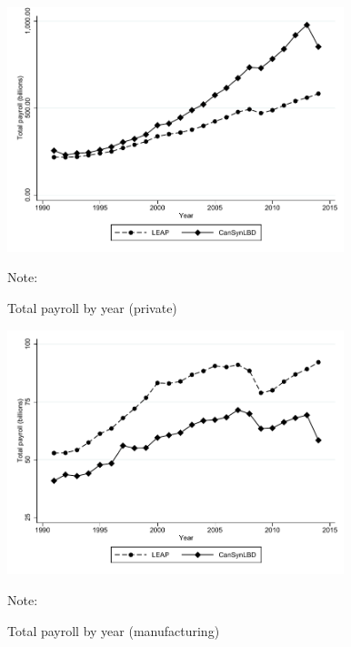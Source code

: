 

\begin{figure} [H]
\centering
\caption{Total payroll by year (private)} \label{tab:Can:TotalPayrollPrivate}
\includegraphics[height=2.8in, width=.7\linewidth]{graphs/Total_payroll_by_year_private_bw.pdf} 
\begin{minipage}{0.85\textwidth}
{\footnotesize Note: \CanTableNote \par}
\end{minipage}
\end{figure}
\begin{figure} [H]
\centering
\caption{Total payroll by year (manufacturing)} \label{tab:Can:TotalPayrollManufacturing}
\includegraphics[height=2.8in, width=.7\linewidth]{graphs/Total_payroll_by_year_manufacturing_bw.pdf} 
\begin{minipage}{0.85\textwidth}
{\footnotesize Note: \CanTableNote \par}
\end{minipage}
\end{figure}




